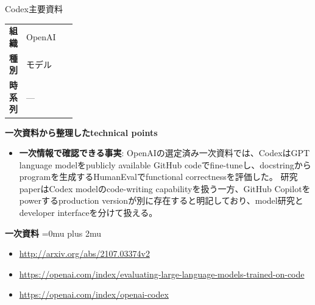 \begin{technicalnote}{Codex}{主要資料}
\begingroup
\begin{tabularx}{\linewidth}{@{}>{\bfseries}p{0.22\linewidth}X@{}}
組織 & OpenAI \\
種別 & モデル \\
時系列 & — \\
\end{tabularx}
\smallskip
{\bfseries 一次資料から整理したtechnical points}
\begin{itemize}[leftmargin=1.5em,itemsep=0.35em]
\item \textbf{一次情報で確認できる事実}: OpenAIの選定済み一次資料では、CodexはGPT language modelをpublicly available GitHub codeでfine-tuneし、docstringからprogramを生成するHumanEvalでfunctional correctnessを評価した。 研究paperはCodex modelのcode-writing capabilityを扱う一方、GitHub Copilotをpowerするproduction versionが別に存在すると明記しており、model研究とdeveloper interfaceを分けて扱える。
\end{itemize}
\begin{minipage}{\linewidth}
\begin{samepage}
{\bfseries 一次資料}
\begingroup\sloppy
\Urlmuskip=0mu plus 2mu\relax
\begin{itemize}[leftmargin=1.5em,itemsep=0.25em]
\item {\scriptsize\url{http://arxiv.org/abs/2107.03374v2}}
\item {\scriptsize\url{https://openai.com/index/evaluating-large-language-models-trained-on-code}}
\item {\scriptsize\url{https://openai.com/index/openai-codex}}
\end{itemize}
\endgroup
\end{samepage}
\end{minipage}
\endgroup
\end{technicalnote}
\medskip

